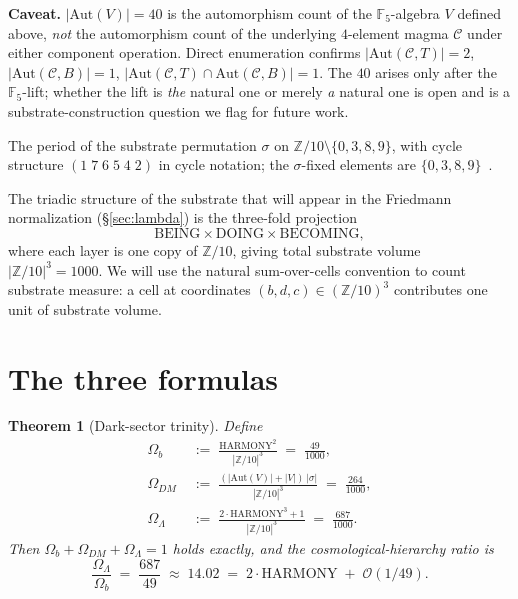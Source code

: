 \documentclass[11pt,reqno]{amsart}
\theoremstyle{plain}
\newtheorem{theorem}{Theorem}[section]
\theoremstyle{definition}
\theoremstyle{remark}
\newcommand{\Z}{\mathbb{Z}}
\newcommand{\F}{\mathbb{F}}
\newcommand{\Aut}{\mathrm{Aut}}
\begin{document}
\begin{description}
\textbf{Caveat.} $|\Aut(V)| = 40$ is the automorphism count of
the $\F_5$-algebra $V$ defined above, \emph{not} the
automorphism count of the underlying $4$-element magma
$\mathcal{C}$ under either component operation. Direct
enumeration confirms
$|\Aut(\mathcal{C}, T)| = 2$, $|\Aut(\mathcal{C}, B)| = 1$,
$|\Aut(\mathcal{C}, T) \cap \Aut(\mathcal{C}, B)| = 1$. The $40$
arises only after the $\F_5$-lift; whether the lift is
\emph{the} natural one or merely \emph{a} natural one is open
and is a substrate-construction question we flag for future
work.
\item[$|\sigma\text{-cycle}| = 6$.] The period of the substrate
permutation $\sigma$ on $\Z/10 \setminus \{0, 3, 8, 9\}$, with
cycle structure $(1\;7\;6\;5\;4\;2)$ in cycle notation; the
$\sigma$-fixed elements are $\{0, 3, 8, 9\}$~\cite{SandersGish2026FourCore}.
\end{description}

The triadic structure of the substrate that will appear in the
Friedmann normalization (\S\ref{sec:lambda}) is the three-fold
projection
\[
  \mathrm{BEING} \times \mathrm{DOING} \times \mathrm{BECOMING},
\]
where each layer is one copy of $\Z/10$, giving total substrate
volume $|\Z/10|^{3} = 1000$. We will use the natural sum-over-cells
convention to count substrate measure: a cell at coordinates
$(b, d, c) \in (\Z/10)^{3}$ contributes one unit of substrate
volume.

\section{The three formulas}\label{sec:trinity}

\begin{theorem}[Dark-sector trinity]\label{thm:trinity}
Define
\begin{align}
\Omega_b      &\;:=\; \frac{\mathrm{HARMONY}^{2}}{|\Z/10|^{3}}                    \;=\; \frac{49}{1000},\label{eq:Ob}\\
\Omega_{DM}   &\;:=\; \frac{(|\Aut(V)| + |V|)\,|\sigma|}{|\Z/10|^{3}}             \;=\; \frac{264}{1000},\label{eq:ODM}\\
\Omega_\Lambda&\;:=\; \frac{2\cdot\mathrm{HARMONY}^{3} + 1}{|\Z/10|^{3}}          \;=\; \frac{687}{1000}.\label{eq:OL}
\end{align}
Then $\Omega_b + \Omega_{DM} + \Omega_\Lambda = 1$ holds exactly,
and the cosmological-hierarchy ratio is
\[
  \frac{\Omega_\Lambda}{\Omega_b}
  \;=\;\frac{687}{49}
  \;\approx\; 14.02
  \;=\; 2 \cdot \mathrm{HARMONY} \;+\; \mathcal{O}(1/49).
\]
\end{theorem}
\end{document}
